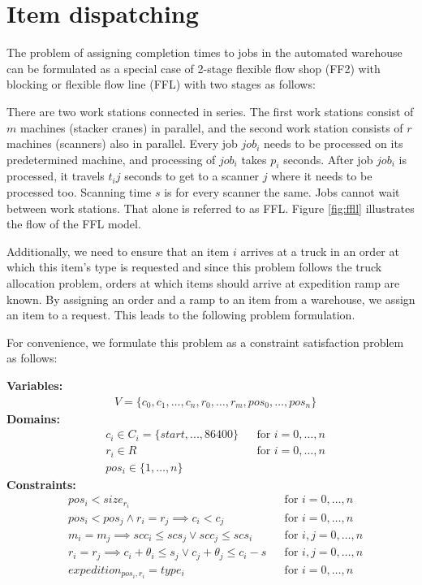 \documentclass{ctuthesis}
\begin{document}
\section{Item dispatching}
\label{sec:expeditiondispatching}
The problem of assigning completion times to jobs in the automated warehouse can be formulated as a special case of 2-stage flexible flow shop (FF2) with blocking or flexible flow line (FFL) with two stages as follows:

There are two work stations connected in series. The first work stations consist of $m$ machines (stacker cranes) in parallel, and the second work station consists of $r$ machines (scanners) also in parallel. Every job $job_i$ needs to be processed on its predetermined machine, and processing of $job_i$ takes $p_i$ seconds. After job $job_i$ is processed, it travels $t_ij$ seconds to get to a scanner $j$ where it needs to be processed too. Scanning time $s$ is for every scanner the same. Jobs cannot wait between work stations. That alone is referred to as FFL. Figure \ref{fig:ffll} illustrates the flow of the FFL model.

Additionally, we need to ensure that an item $i$ arrives at a truck in an order at which this item's type is requested and since this problem follows the truck allocation problem, orders at which items should arrive at expedition ramp are known. By assigning an order and a ramp to an item from a warehouse, we assign an item to a request. This leads to the following problem formulation.

For convenience, we formulate this problem as a constraint satisfaction problem as follows:

\textbf{Variables:}
\begin{align}
    &V = \{c_{0}, c_{1}, \ldots, c_{n},r_0, \ldots, r_m, pos_0, \ldots, pos_n\}
\end{align}
\textbf{Domains:}
\begin{align}
&c_{i} \in C_i = \{start, ..., 86400\} && \text{for } i=0,\ldots,n\\
&r_{i} \in R && \text{for } i=0,\ldots,n\\
&pos_i \in \{1, \ldots, n\}
\end{align}
\textbf{Constraints:}
 \begin{align}
& pos_i < size_{r_i} && \text{for } i=0,\ldots,n \nonumber \\
& pos_i < pos_j \land r_i = r_j \implies c_i < c_j && \text{for } i=0,\ldots,n\\ \label{eq:idcons1}
& m_i = m_j \implies scc_i \leq scs_j \lor scc_j \leq scs_i && \text{for } i,j=0,\ldots,n\\ \label{eq:idcons2}
& r_i = r_j \implies c_i  + \theta_i \leq s_j \lor c_j + \theta_j \leq c_i - s && \text{for } i,j=0,\ldots,n\\ \label{eq:idcons3}
& expedition_{pos_i,r_i} = type_i  && \text{for } i=0,\ldots,n\\ \label{eq:idcons4}
\end{align}
\end{document}
